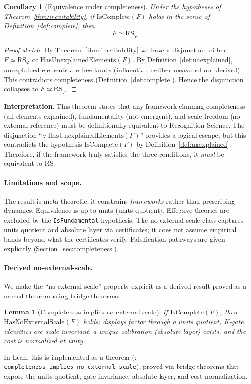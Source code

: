 \documentclass[12pt]{article}
\newtheorem{lemma}[theorem]{Lemma}
\newtheorem{corollary}[theorem]{Corollary}
\theoremstyle{remark}
\begin{document}
\begin{corollary}[Equivalence under completeness]\label{cor:equivalence}
Under the hypotheses of Theorem~\ref{thm:inevitability}, if $\mathrm{IsComplete}(F)$ holds in the sense of Definition~\ref{def:complete}, then
\[
F \simeq \mathrm{RS}_\varphi\,.
\]
\end{corollary}

\begin{proof}[Proof sketch]
By Theorem~\ref{thm:inevitability} we have a disjunction: either $F \simeq \mathrm{RS}_\varphi$ or $\mathrm{HasUnexplainedElements}(F)$. By Definition~\ref{def:unexplained}, unexplained elements are free knobs (influential, neither measured nor derived). This contradicts completeness (Definition~\ref{def:complete}). Hence the disjunction collapses to $F \simeq \mathrm{RS}_\varphi$.
\end{proof}

\textbf{Interpretation}. This theorem states that any framework claiming completeness (all elements explained), fundamentality (not emergent), and scale-freedom (no external reference) must be definitionally equivalent to Recognition Science. The disjunction ``$\lor\, \mathrm{HasUnexplainedElements}(F)$'' provides a logical escape, but this contradicts the hypothesis $\mathrm{IsComplete}(F)$ by Definition~\ref{def:unexplained}. Therefore, if the framework truly satisfies the three conditions, it \emph{must} be equivalent to RS.

\paragraph{Limitations and scope.} The result is meta-theoretic: it constrains \emph{frameworks} rather than prescribing dynamics. Equivalence is up to units (units quotient). Effective theories are excluded by the \texttt{IsFundamental} hypothesis. The no-external-scale class captures units quotient and absolute layer via certificates; it does not assume empirical bands beyond what the certificates verify. Falsification pathways are given explicitly (Section~\ref{sec:completeness}).

\paragraph{Derived no-external-scale.} We make the ``no external scale'' property explicit as a derived result proved as a named theorem using bridge theorems:
\begin{lemma}[Completeness implies no external scale]\label{lem:complete-no-external-scale}
If $\mathrm{IsComplete}(F)$, then $\mathrm{HasNoExternalScale}(F)$ holds: displays factor through a units quotient, K-gate identities are scale-invariant, a unique calibration (absolute layer) exists, and the cost is normalized at unity.
\end{lemma}
In Lean, this is implemented as a theorem (: \texttt{completeness\_implies\_no\_external\_scale}), proved via bridge theorems that expose the units quotient, gate invariance, absolute layer, and cost normalization.
\end{document}
